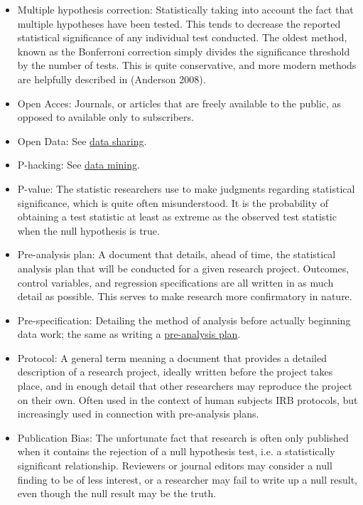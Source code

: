 \documentclass[12pt] {article}
\begin{document}
\begin{itemize}
\item
Multiple hypothesis correction: Statistically taking into account the fact that multiple hypotheses have been tested. This tends to decrease the reported statistical significance of any individual test conducted. The oldest method, known as the Bonferroni correction simply divides the significance threshold by the number of tests. This is quite conservative, and more modern methods are helpfully described in (Anderson 2008).

\item
Open Acces: Journals, or articles that are freely available to the public, as opposed to available only to subscribers.

\item
Open Data: See \hyperref[def-datasharing]{data sharing}.

\item
P-hacking: See \hyperref[def-mining]{data mining}.

\item \label{def-pvalue}
P-value: The statistic researchers use to make judgments regarding statistical significance, which is quite often misunderstood. It is the probability of obtaining a test statistic at least as extreme as the observed test statistic when the null hypothesis is true. 

\item\label{def-pap}
Pre-analysis plan: A document that details, ahead of time, the statistical analysis plan that will be conducted for a given research project. Outcomes, control variables, and regression specifications are all written in as much detail as possible. This serves to make research more confirmatory in nature. 

\item
Pre-specification: Detailing the method of analysis before actually beginning data work; the same as writing a \hyperref[def-pap]{pre-analysis plan}.

\item
Protocol: A general term meaning a document that provides a detailed description of a research project, ideally written before the project takes place, and in enough detail that other researchers may reproduce the project on their own. Often used in the context of human subjects IRB protocols, but increasingly used in connection with pre-analysis plans. 

\item
Publication Bias: The unfortunate fact that research is often only published when it contains the rejection of a null hypothesis test, i.e. a statistically significant relationship. Reviewers or journal editors may consider a null finding to be of less interest, or a researcher may fail to write up a null result, even though the null result may be the truth.


\end{itemize}
\end{document}
